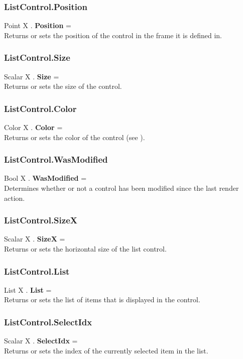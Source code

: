 \subsubsection{ListControl.Position \label{F:ListControl:Position}}
Point X . \textbf{Position} = \\
Returns or sets the position of the control in the frame it is defined in.

\subsubsection{ListControl.Size \label{F:ListControl:Size}}
Scalar X . \textbf{Size} = \\
Returns or sets the size of the control.

\subsubsection{ListControl.Color \label{F:ListControl:Color}}
Color X . \textbf{Color} = \\
Returns or sets the color of the control (see ).

\subsubsection{ListControl.WasModified \label{F:ListControl:WasModified}}
Bool X . \textbf{WasModified} = \\
Determines whether or not a control has been modified since the last render action.

\subsubsection{ListControl.SizeX \label{F:ListControl:SizeX}}
Scalar X . \textbf{SizeX} = \\
Returns or sets the horizontal size of the list control.

\subsubsection{ListControl.List \label{F:ListControl:List}}
List X . \textbf{List} = \\
Returns or sets the list of items that is displayed in the control.

\subsubsection{ListControl.SelectIdx \label{F:ListControl:SelectIdx}}
Scalar X . \textbf{SelectIdx} = \\
Returns or sets the index of the currently selected item in the list.


